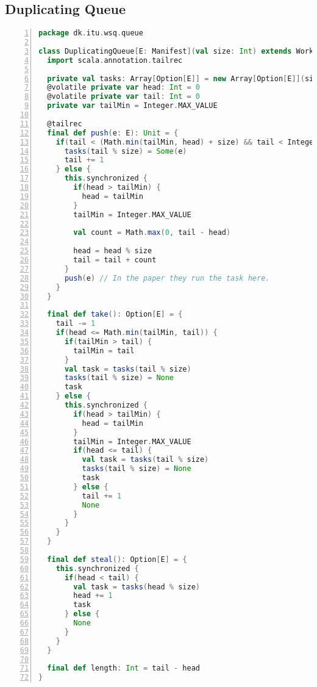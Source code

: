 \subsection{Duplicating Queue}
\begin{lstlisting}[language=scala,basicstyle=\ttfamily\bfseries\scriptsize,numbers=left]
package dk.itu.wsq.queue

class DuplicatingQueue[E: Manifest](val size: Int) extends WorkStealingQueue[E] {
  import scala.annotation.tailrec

  private val tasks: Array[Option[E]] = new Array[Option[E]](size)
  @volatile private var head: Int = 0
  @volatile private var tail: Int = 0
  private var tailMin = Integer.MAX_VALUE

  @tailrec
  final def push(e: E): Unit = {
    if(tail < (Math.min(tailMin, head) + size) && tail < Integer.MAX_VALUE/2) {
      tasks(tail % size) = Some(e)
      tail += 1
    } else {
      this.synchronized {
        if(head > tailMin) {
          head = tailMin
        }
        tailMin = Integer.MAX_VALUE

        val count = Math.max(0, tail - head)

        head = head % size
        tail = tail + count
      }
      push(e) // In the paper they run the task here.
    }
  }

  final def take(): Option[E] = {
    tail -= 1
    if(head <= Math.min(tailMin, tail)) {
      if(tailMin > tail) {
        tailMin = tail
      }      
      val task = tasks(tail % size)
      tasks(tail % size) = None
      task
    } else {
      this.synchronized {
        if(head > tailMin) {
          head = tailMin
        }
        tailMin = Integer.MAX_VALUE
        if(head <= tail) {
          val task = tasks(tail % size)
          tasks(tail % size) = None
          task
        } else {
          tail += 1
          None
        }
      } 
    }
  }

  final def steal(): Option[E] = {
    this.synchronized {
      if(head < tail) {
        val task = tasks(head % size)
        head += 1
        task
      } else {
        None
      }
    }
  }

  final def length: Int = tail - head
}

\end{lstlisting}

